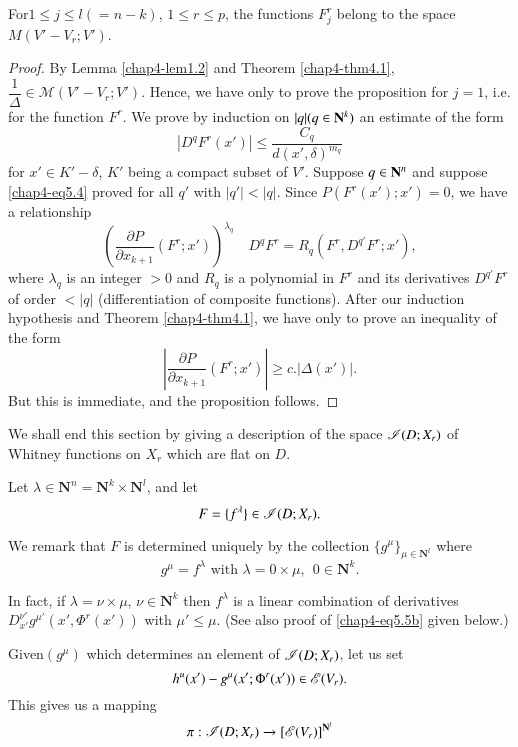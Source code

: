 \setcounter{theorem}{2}
\begin{proposition}\label{chap4-prop5.3}%
  For\pageoriginale $1 \leq j \leq l (= n - k)$, $1 \leq r \leq p $, the functions $F^r_j$ belong to the space $M (V'-V_r ; V')$.
\end{proposition}

\begin{proof}
  By Lemma \ref{chap4-lem1.2} and Theorem \ref{chap4-thm4.1}, $\dfrac{1}{\Delta} \in \mathscr{M} (V'-V_r; V')$. Hence, we have only to prove the proposition for $j=1$, i.e. for the function $F^r$. We prove by induction on $|q| (q\in \mathbf{N}^k)$ an estimate of the form
   \begin{equation*}
|D^q F^r (x')| \leq  \frac{C_q }{d (x', \delta)^{m_q}}  \tag{5.4}\label{chap4-eq5.4}
  \end{equation*}
   for $x' \in K' - \delta$, $K'$ being a compact subset of $V'$. Suppose $q \in \mathbf{N}^n$ and suppose \eqref{chap4-eq5.4} proved for all $q'$ with $|q'|<|q|$. Since $P(F^r (x'); x') =0$, we have a relationship
   $$
\left(\frac{\partial P}{\partial x_{k+1}} (F^r; x') \right)^{\lambda_q} \quad D^q F^r = R_q (F^r, D^{q'} F^r; x'),
$$
where $\lambda_q$ is an integer $> 0$ and $R_q$ is a polynomial in $F^r$ and its derivatives $D^{q'} F^r$  of order $<|q|$ (differentiation of composite functions). After our induction hypothesis and Theorem \ref{chap4-thm4.1}, we have only to prove an inequality of the form
$$
\left|\frac{\partial P}{\partial x_{k+1}} (F^r; x') \right| \geq c. |\Delta (x')|.
$$
But this is immediate, and the proposition follows.
\end{proof}

We shall end this section by giving a description of the space $\mathscr{I} (D; X_r)$ of Whitney functions on $X_r$ which are flat on $D$. 

Let $\lambda \in \mathbf{N}^n = \mathbf{N}^k \times \mathbf{N}^l$, and let
$$
F = \{f^\lambda\} \in \mathscr{I} (D; X_r).
$$

We remark that $F$ is determined uniquely by the collection $\{g^\mu\}_{\mu \in \mathbf{N}^l}$ where 
$$
g^\mu = f^\lambda \text{ with } \lambda = 0 \times \mu, ~~ 0 \in \mathbf{N}^k.
$$

In fact, if $\lambda = \nu \times \mu$, $\nu \in \mathbf{N}^k$ then $f^\lambda$ is a linear combination of derivatives $D^{\nu'}_{x'} g^{\mu'} (x', \Phi^r (x'))$ with $\mu' \leq \mu$. (See also proof of \eqref{chap4-eq5.5b} given below.)

Given\pageoriginale $(g^\mu)$ which determines an element of $\mathscr{I}(D;X_r)$, let us set
$$
h^u (x') - g^\mu (x' ;\Phi^r (x')) \in \mathscr{E} (V_r).
$$
This gives us a mapping
$$
\pi : \mathscr{I} (D ; X_r) \to [\mathscr{E} (V_r)]^{\mathbf{N}^l}
$$

